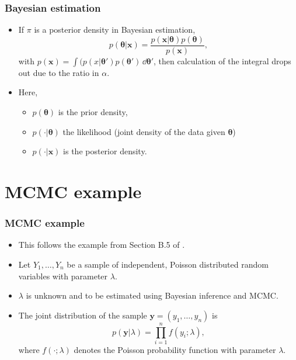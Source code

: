 \documentclass[xcolor=table,10pt]{beamer}
\begin{document}
\begin{frame}
  \frametitle{Bayesian estimation} 
  \begin{itemize}
\item If $\pi$ is a posterior density in Bayesian estimation,
\begin{equation*}
  p(\bm \theta|\bm x) = \frac{p(\bm x|\bm \theta)
  p(\bm \theta)} {p(\bm x)},
\end{equation*}
with $p(\bm x) = \int(p(x|\bm \theta') p(\bm \theta')\,\dd
\bm \theta'$, then calculation of the integral drops out due to the
ratio in $\alpha$.
\item Here,
  \begin{itemize}
  \item $p(\bm\theta)$ is the \alert{prior density},
  \item $p(\cdot|\bm \theta)$ the \alert{likelihood} (joint
    density of the data given $\bm \theta$)
  \item $p(\cdot|\bm x)$ is the \alert{posterior density}.
  \end{itemize}
\end{itemize}
\end{frame}


\section{MCMC example}

\begin{frame}
  \frametitle{MCMC example}
  \begin{itemize}
  \item This follows the example from Section B.5 of
    \citep{Fahrmeir2009}. 
  \item Let $Y_1, \ldots, Y_n$ be a sample of independent, Poisson
    distributed random variables with parameter $\lambda$.
    \item $\lambda$ is unknown and to be estimated using Bayesian
      inference and MCMC. 
\item The joint distribution of the sample $\bm y=(y_1,\ldots, y_n)$ 
  is 
\begin{equation*}
  p(\bm y|\lambda) = \prod_{i=1}^n f(y_i;\lambda),
\end{equation*}
where $f(\cdot; \lambda)$ denotes the Poisson probability function
with parameter $\lambda$.
\end{itemize}
\end{frame}
\end{document}
